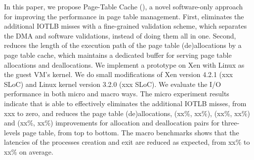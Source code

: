 \documentclass[letterpaper,twocolumn,10pt]{article}
\begin{document}
In this paper, we propose Page-Table Cache (\name), a novel software-only approach for improving the performance in page table management.
First, \name eliminates the additional IOTLB misses with a fine-grained validation scheme, which separates the DMA and software validations, instead of doing them all in one.
Second, \name reduces the length of the execution path of the page table (de)allocations by a page table cache, which maintains a dedicated buffer for serving page table allocations and deallocations. 
We implement a prototype on Xen with Linux as the guest VM's kernel. We do small modifications of Xen version 4.2.1 (xxx SLoC) and Linux kernel version 3.2.0 (xxx SLoC). 
We evaluate the I/O performance in both micro and macro ways. 
The micro experiment results indicate that \name is able to effectively eliminates the additional IOTLB misses, from xxx to zero, and reduces the page table (de)allocations, (xx\%, xx\%), (xx\%, xx\%) and (xx\%, xx\%) improvements for allocation and deallocation pairs for three-levels page table, from top to bottom.
The macro benchmarks shows that the latencies of the processes creation and exit are reduced as expected, from xx\% to xx\% on average.






%




%
%






{


}
\end{document}

